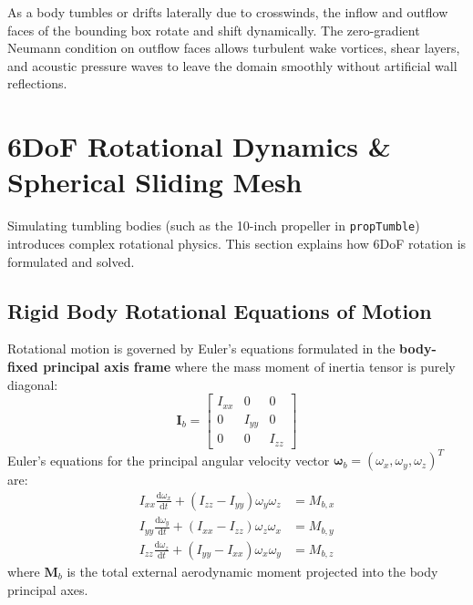 \documentclass[11pt,a4paper]{article}
\newcommand{\vect}[1]{\mathbf{#1}}
\newcommand{\tensor}[1]{\bm{#1}}
\newcommand{\dderiv}[2]{\frac{\mathrm{d} #1}{\mathrm{d} #2}}
\newcommand{\omegab}{\bm{\omega}_b}
\begin{document}
\begin{tipbox}
As a body tumbles or drifts laterally due to crosswinds, the inflow and outflow faces of the bounding box rotate and shift dynamically. 
The zero-gradient Neumann condition on outflow faces allows turbulent wake vortices, shear layers, and acoustic pressure waves to leave the domain smoothly without artificial wall reflections.
\end{tipbox}

\section{6DoF Rotational Dynamics \& Spherical Sliding Mesh}

Simulating tumbling bodies (such as the 10-inch propeller in \texttt{propTumble}) introduces complex rotational physics. This section explains how 6DoF rotation is formulated and solved.

\subsection{Rigid Body Rotational Equations of Motion}
Rotational motion is governed by Euler's equations formulated in the \textbf{body-fixed principal axis frame} where the mass moment of inertia tensor is purely diagonal:
\begin{equation}
    \tensor{I}_b = 
    \begin{bmatrix}
        I_{xx} & 0 & 0 \\
        0 & I_{yy} & 0 \\
        0 & 0 & I_{zz}
    \end{bmatrix}
\end{equation}
Euler's equations for the principal angular velocity vector $\omegab = (\omega_x, \omega_y, \omega_z)^T$ are:
\begin{equation}
    \boxed{
    \begin{aligned}
        I_{xx} \dderiv{\omega_x}{t} + (I_{zz} - I_{yy}) \omega_y \omega_z &= M_{b,x} \\
        I_{yy} \dderiv{\omega_y}{t} + (I_{xx} - I_{zz}) \omega_z \omega_x &= M_{b,y} \\
        I_{zz} \dderiv{\omega_z}{t} + (I_{yy} - I_{xx}) \omega_x \omega_y &= M_{b,z}
    \end{aligned}
    }
    \label{eq:euler_rotation}
\end{equation}
where $\vect{M}_b$ is the total external aerodynamic moment projected into the body principal axes.
\end{document}
